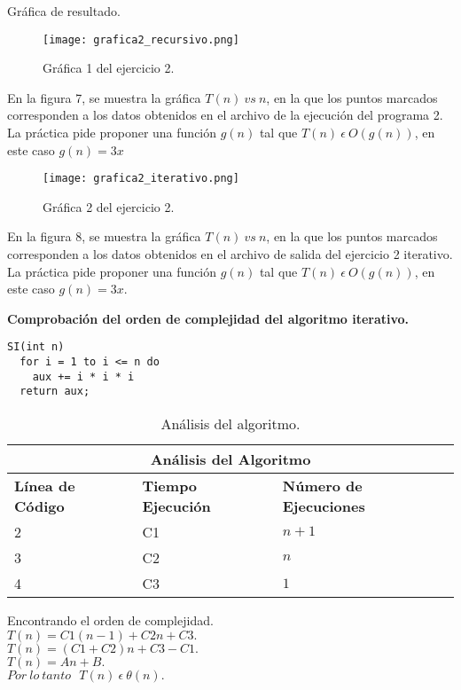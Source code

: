 \documentclass[12pt]{report}
\begin{document}
	
	Gráfica de resultado.\\
	\begin{figure}[H]
		\texttt{[image: grafica2\_recursivo.png]}
		\centering
		\caption{Gráfica 1 del ejercicio 2.}
		\centering
	\end{figure}
	En la figura 7, se muestra la gráfica $T(n) \ vs \ n$, en la que los puntos marcados corresponden a los datos obtenidos en el archivo de la ejecución del programa 2. La práctica pide proponer una función $g(n) $ tal que $T(n) \ \epsilon \ O(g(n))$, en este caso $g(n)=3x$\\
	
	\begin{figure}[H]
		\texttt{[image: grafica2\_iterativo.png]}
		\centering
		\caption{Gráfica 2 del ejercicio 2.}
		\centering
	\end{figure}
	En la figura 8, se muestra la gráfica $T(n) \ vs \ n$, en la que los puntos marcados corresponden a los datos obtenidos en el archivo de salida del ejercicio 2 iterativo.  La práctica pide proponer una función $g(n) $ tal que $T(n) \ \epsilon \ O(g(n))$, en este caso $g(n)=3x$.\newpage
	
	\textbf{Comprobación del orden de complejidad del algoritmo iterativo.} \\
	
	\lstset{language=C, breaklines=true, basicstyle=\footnotesize}
	\lstset{numbers=left, numberstyle=\tiny, stepnumber=1, numbersep=10pt}
	\begin{lstlisting}
SI(int n)
  for i = 1 to i <= n do
    aux += i * i * i
  return aux;
	\end{lstlisting}
	
	\begin{table}[htbp]
		\begin{center}
			\begin{tabular}{|l|l|l|}
				\hline
				\multicolumn{3}{|c|}{Análisis del Algoritmo} \\ 
				\hline
				\textbf{Línea de Código} & \textbf{Tiempo Ejecución} & \textbf{Número de Ejecuciones}\\
				\hline
				2 & C1 & $n+1$ \\ \hline
				3 & C2 & $n$ \\ \hline
				4 & C3 & $1$ \\ \hline
			\end{tabular}
			\caption{Análisis del algoritmo.}
			\label{tabla:analisis2}
		\end{center}
	\end{table}
	Encontrando el orden de complejidad.\\
	$T(n)= C1(n-1)+C2n+C3.$\\
	$T(n)= (C1+C2)n+C3-C1.$\\
	$T(n)=An+B.$\\
	$Por \ lo \ tanto \ \ \ T(n) \ \epsilon \ \theta (n).$\newpage
	
\end{document}
